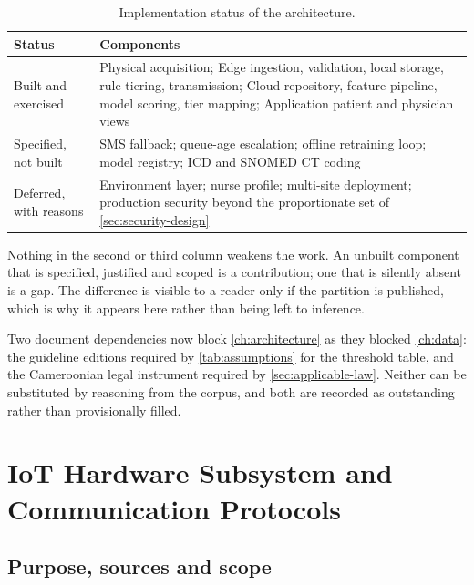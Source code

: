 \documentclass[12pt,a4paper,oneside]{report}
\begin{document}
\begin{table}[htbp]
\centering\footnotesize
\caption{Implementation status of the architecture.}\label{tab:build-status}
\begin{tabularx}{\textwidth}{@{}>{\raggedright\arraybackslash}p{3.0cm} X@{}}
\toprule
\textbf{Status} & \textbf{Components} \\
\midrule
Built and exercised & Physical acquisition; Edge ingestion, validation, local storage, rule tiering, transmission; Cloud repository, feature pipeline, model scoring, tier mapping; Application patient and physician views \\
Specified, not built & SMS fallback; queue-age escalation; offline retraining loop; model registry; ICD and SNOMED CT coding \\
Deferred, with reasons & Environment layer; nurse profile; multi-site deployment; production security beyond the proportionate set of \cref{sec:security-design} \\
\bottomrule
\end{tabularx}
\end{table}

Nothing in the second or third column weakens the work. An unbuilt component that is specified, justified and scoped is a contribution; one that is silently absent is a gap. The difference is visible to a reader only if the partition is published, which is why it appears here rather than being left to inference.

Two document dependencies now block \cref{ch:architecture} as they blocked \cref{ch:data}: the guideline editions required by \cref{tab:assumptions} for the threshold table, and the Cameroonian legal instrument required by \cref{sec:applicable-law}. Neither can be substituted by reasoning from the corpus, and both are recorded as outstanding rather than provisionally filled.

\section{IoT Hardware Subsystem and Communication Protocols}\label{sec:iot}

\subsection*{Purpose, sources and scope}\label{sec:iot-scope}
\end{document}
